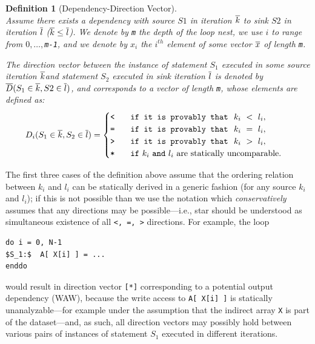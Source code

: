 \documentclass[acmsmall,review]{acmart}\settopmatter{printfolios=true,printccs=false,printacmref=false}
\newtheorem{mydef}{Definition}
\begin{document}
\begin{mydef}[Dependency-Direction Vector]\label{Dep-Dir-Vect}
$\mbox{ }$\\
Assume there exists a dependency with source $S1$ in iteration $\overline{k}$
to sink $S2$ in iteration $\overline{l}$ ($\overline{k}\leq\overline{l}$).
We denote by {\tt m} the depth of the loop nest, we use $i$ to range
from {\tt $0,\ldots,$m-1}, and we denote by $x_i$ the $i^{th}$
element of some vector $\overline{x}$ of length {\tt m}.

The \emph{direction vector} between the instance of statement $S_1$ 
executed in some source iteration $\overline{k}$and statement $S_2$ executed
in sink iteration $\overline{l}$ is denoted by $\overline{D}(S_1\in\overline{k},S2\in\overline{l})$,
and corresponds to a vector of length {\tt m}, whose elements are defined as:
\[
D_i(S_1\in\overline{k},S_2\in\overline{l})=
    \begin{cases} 
        \mbox{\tt<} \ \ \ \ \mbox{\tt if it is provably that} ~~k_i ~<~ l_i,\\
        \mbox{\tt=} \ \ \ \ \mbox{\tt if it is provably that} ~~k_i ~=~ l_i,\\
        \mbox{\tt>} \ \ \ \ \mbox{\tt if it is provably that} ~~k_i ~>~ l_i,\\
        \mbox{\tt{}*} \ \ \ \ \mbox{\tt if}~k_i ~\mbox{\tt{}and}~ l_i~\mbox{are statically uncomparable.}\\
    \end{cases}
\]
\end{mydef}

The first three cases of the definition above assume that the ordering
relation between $k_i$ and $l_i$ can be statically derived in a generic
fashion (for any source $k_i$ and $l_i$); if this is not possible than 
we use the notation {\tt *} which \emph{conservatively} assumes that any 
directions may be possible---i.e., star should be understood as 
simultaneous existence of all {\tt <, =, >} directions. For example,
the loop
\begin{lstlisting}[mathescape=true]
do i = 0, N-1
$S_1:$  A[ X[i] ] = ...
enddo
\end{lstlisting}\vspace{-2ex}
would result in direction vector {\tt[*]} corresponding to a potential
output dependency (WAW), because the write access to {\tt A[ X[i] ]} is 
statically unanalyzable---for example under the assumption that 
the indirect array {\tt X} is part of the dataset---and, as such, 
all direction vectors may possibly hold between various pairs of 
instances of statement $S_1$ executed in different iterations.
\end{document}
